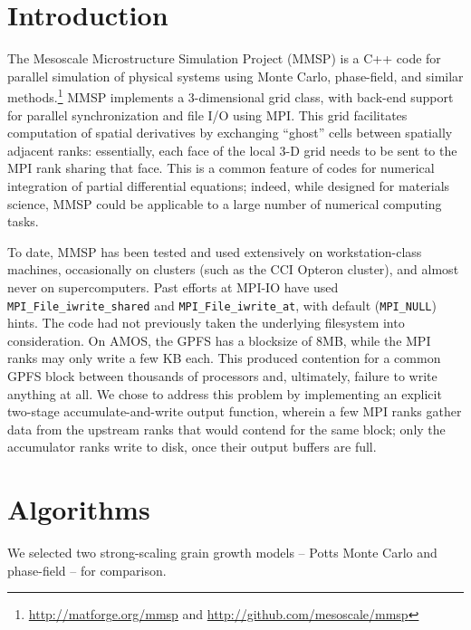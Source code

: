 \documentclass[11pt]{article}
\begin{document}
\begin{multicols*}{2}
\section{Introduction}
The Mesoscale Microstructure Simulation Project (MMSP) is a C++ code for parallel simulation of physical systems using Monte Carlo, phase-field, and similar methods.\footnote{\url{http://matforge.org/mmsp} and \url{http://github.com/mesoscale/mmsp}}
MMSP implements a 3-dimensional grid class, with back-end support for parallel synchronization and file I/O using MPI.
This grid facilitates computation of spatial derivatives by exchanging ``ghost'' cells between spatially adjacent ranks:
essentially, each face of the local 3-D grid needs to be sent to the MPI rank sharing that face.
This is a common feature of codes for numerical integration of partial differential equations;
indeed, while designed for materials science, MMSP could be applicable to a large number of numerical computing tasks.

To date, MMSP has been tested and used extensively on workstation-class machines, occasionally on clusters (such as the CCI Opteron cluster), and almost never on supercomputers.
Past efforts at MPI-IO have used \texttt{MPI\_File\_iwrite\_shared} and \texttt{MPI\_File\_iwrite\_at}, with default (\texttt{MPI\_NULL}) hints.
The code had not previously taken the underlying filesystem into consideration.
On AMOS, the GPFS has a blocksize of 8MB, while the MPI ranks may only write a few KB each.
This produced contention for a common GPFS block between thousands of processors and, ultimately, failure to write anything at all.
We chose to address this problem by implementing an explicit two-stage accumulate-and-write output function, wherein a few MPI ranks gather data from the upstream ranks that would contend for the same block;
only the accumulator ranks write to disk, once their output buffers are full.


\section{Algorithms}
We selected two strong-scaling grain growth models -- Potts Monte Carlo and phase-field -- for comparison.


\end{multicols*}
\end{document}
